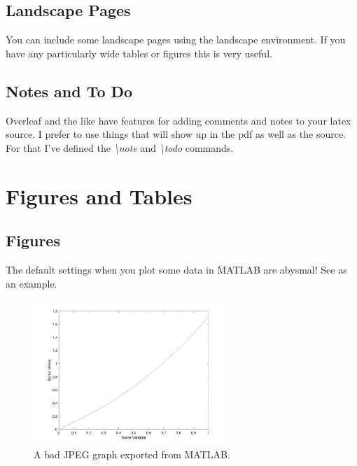 \documentclass{BCUReport}
\begin{document}
\begin{appendices}
    \begin{landscape}
    \subsection{Landscape Pages}
        You can include some landscape pages using the landscape environment. If you have any particularly wide tables or figures this is very useful.
        \end{landscape}

    \subsection{Notes and To Do}
        Overleaf and the like have features for adding comments and notes to your latex source. I prefer to use things that will show up in the pdf as well as the source. For that I've defined the \textit{\textbackslash note} and \textit{\textbackslash todo} commands.
    
        
            
\section{Figures and Tables}
\label{sec:FiguresAndTables}

    \subsection{Figures}
    \label{sec:Figures}

        The default settings when you plot some data in MATLAB are abysmal! See  as an example.
    
        \begin{figure}[ht!]
            \centering
            \includegraphics[width=0.65\textwidth]{Images/a_graph.jpg}
            \caption{A bad JPEG graph exported from MATLAB.}
            \label{fig:BadGraph}
        \end{figure}
    

\end{appendices}
\end{document}
